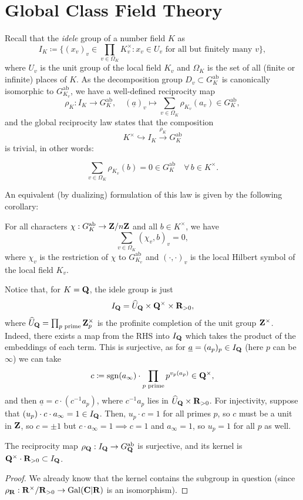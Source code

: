 \documentclass{article}
\begin{document}
\section{Global Class Field Theory}
Recall that the \emph{idele} group of a number field $K$ as
\[
	I_K \coloneqq \{(x_v)_v \in \prod_{v\in \Omega_K} K_v^\times : x_v\in U_v \text{ for all but finitely many }v\},
\]
where $U_v$ is the unit group of the local field $K_v$ and $\Omega_K$ is the set of all (finite or infinite) places of $K$. As the decomposition group $D_v\subset G_K^\text{ab}$ is canonically isomorphic to $G_{K_v}^\text{ab}$, we have a well-defined reciprocity map
\[
	\rho_K: I_K \to G_K^\text{ab}, \quad (\underline{a})_v \mapsto \sum_{v\in \Omega_K} \rho_{K_v}(a_v) \in G_K^\text{ab},
\]
and the global reciprocity law states that the composition
\[
	K^\times \hookrightarrow I_K \xrightarrow{\rho_K} G_K^\text{ab}
\]
is trivial, in other words:

\[
	\sum_{v\in \Omega_K} \rho_{K_v}(b) = 0 \in G_K^\text{ab} \quad \forall\, b\in K^\times.
\]

An equivalent (by dualizing) formulation of this law is given by the following corollary:
\begin{cor}
		For all characters $\chi: G_K^\text{ab} \to \mathbf{Z}/n\mathbf{Z}$ and all $b\in K^\times$, we have
		\[
			\sum_{v\in \Omega_K} (\chi_v, b)_v = 0,
		\]
		where $\chi_v$ is the restriction of $\chi$ to $G_{K_v}^\text{ab}$ and $(\cdot,\cdot)_v$ is the local Hilbert symbol of the local field $K_v$.
\end{cor}
Notice that, for $K=\mathbf{Q}$, the idele group is just
\[
	I_{\mathbf{Q}} = \widehat{U}_{\mathbf{Q}} \times \mathbf{Q}^\times \times \mathbf{R}_{>0},
\]
where $\widehat{U}_{\mathbf{Q}} = \prod_{p\text{ prime}} \mathbf{Z}_p^\times$ is the profinite completion of the unit group $\mathbf{Z}^\times$. Indeed, there exists a map from the RHS into $I_{\mathbf{Q}}$ which takes the product of the embeddings of each term. This is surjective, as for $\underline{a}=(a_p)_p\in I_{\mathbf{Q}}$ (here $p$ can be $\infty$) we can take $$c\coloneqq \operatorname{sgn}(a_\infty)\cdot \prod_{p\text{ prime}} p^{v_p(a_p)}\in \mathbf{Q}^\times,$$ and then $\underline{a}=c\cdot (c^{-1}a_p)$, where $c^{-1}a_p$ lies in $\widehat{U}_{\mathbf{Q}} \times \mathbf{R}_{>0}$. For injectivity, suppose that $(u_p)\cdot c \cdot a_\infty = 1 \in I_{\mathbf{Q}}$. Then, $u_p\cdot c = 1$ for all primes $p$, so $c$ must be a unit in $\mathbf{Z}$, so $c=\pm 1$ but $c\cdot a_\infty=1\implies c=1$ and $a_\infty=1$, so $u_p=1$ for all $p$ as well.

\begin{cor}
		The reciprocity map $\rho_{\mathbf{Q}}: I_{\mathbf{Q}} \to G_{\mathbf{Q}}^\text{ab}$ is surjective, and its kernel is $\mathbf{Q}^\times \cdot \mathbf{R}_{>0}\subset I_{\mathbf{Q}}$.
\end{cor}
\begin{proof}
		We already know that the kernel contains the subgroup in question (since $\rho_{\mathbf{R}}: \mathbf{R}^\times / \mathbf{R}_{>0} \to \operatorname{Gal}(\mathbf{C}|\mathbf{R})$ is an isomorphism). 
\end{proof}
\end{document}
